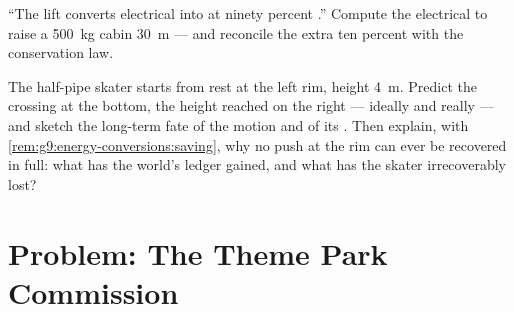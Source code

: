\begin{exercise}[$\star\star$]\label{exo:g9:energy-conversions:11}
``The lift converts electrical  into  at ninety percent .'' Compute the
electrical  to raise a \qty{500}{kg} cabin
\qty{30}{m} --- and reconcile the extra ten percent with
the conservation law.
\end{exercise}

\begin{exercise}[$\star\star\star$]\label{exo:g9:energy-conversions:12}
The half-pipe skater starts from rest at the left rim,
height \qty{4}{m}. Predict the crossing  at the
bottom, the height reached on the right --- ideally and
really --- and sketch the long-term fate of the motion and
of its . Then explain, with
\cref{rem:g9:energy-conversions:saving}, why no push at
the rim can ever be recovered in full: what has the
world's ledger gained, and what has the skater
irrecoverably lost?
\end{exercise}

\section{Problem: The Theme Park Commission}

